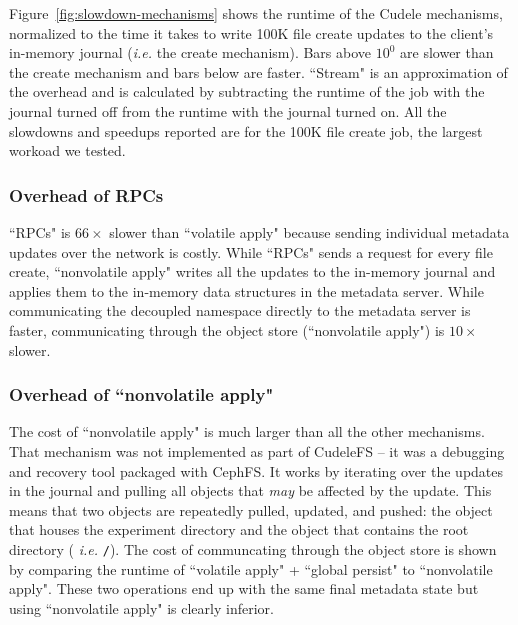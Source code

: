 Figure~\ref{fig:slowdown-mechanisms} shows the runtime of the Cudele
mechanisms, normalized to the time it takes to write 100K file create updates
to the client's in-memory journal ({\it i.e.} the create mechanism). Bars above
\(10^0\) are slower than the create mechanism and bars below are faster.
``Stream" is an approximation of the overhead and is calculated by subtracting
the runtime of the job with the journal turned off from the runtime with the
journal turned on. All the slowdowns and speedups reported are for the 100K
file create job, the largest workoad we tested.

\subsubsection{Overhead of RPCs} ``RPCs" is \(66\times\) slower than ``volatile
apply" because sending individual metadata updates over the network is costly.
While ``RPCs" sends a request for every file create, ``nonvolatile apply"
writes all the updates to the in-memory journal and applies them to the
in-memory data structures in the metadata server. While communicating the
decoupled namespace directly to the metadata server is faster, communicating
through the object store (``nonvolatile apply") is \(10\times\) slower.

\subsubsection{Overhead of ``nonvolatile apply"} The cost of ``nonvolatile
apply" is much larger than all the other mechanisms.  That mechanism was not
implemented as part of CudeleFS -- it was a debugging and recovery tool packaged
with CephFS. It works by iterating over the updates in the journal and pulling
all objects that {\it may} be affected by the update.  This means that two
objects are repeatedly pulled, updated, and pushed: the object that houses the
experiment directory and the object that contains the root directory ({\it
i.e.} \texttt{/}).  The cost of communcating through the object store is shown
by comparing the runtime of ``volatile apply" + ``global persist" to
``nonvolatile apply". These two operations end up with the same final metadata
state but using ``nonvolatile apply" is clearly inferior.

